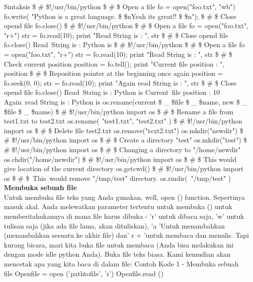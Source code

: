 Sintaksis 
 \$  \#  \$!/usr/bin/python 
 \$  \#  \$ Open a file  
fo = open("foo.txt", "wb") 
fo.write( "Python is a great language. \$  \setminus  \$nYeah its great!! \$  \setminus  \$n");  
 \$  \#  \$ Close opend file  
fo.close()  
 \$  \#  \$!/usr/bin/python  
 \$  \#  \$ Open a file 
fo = open("foo.txt", "r+") 
str = fo.read(10); 
print "Read String is : ", str 
 \$  \#  \$ Close opend file 
fo.close()  
Read~String is :  Python is 
 \$  \#  \$!/usr/bin/python 
 \$  \#  \$ Open a file  
fo = open("foo.txt", "r+") 
str = fo.read(10);
print "Read String is : ", str 
 \$  \#  \$ Check current position 
position = fo.tell(); 
print "Current file position : ", position 
 \$  \#  \$ Reposition pointer at the beginning once again  
position = fo.seek(0, 0);  
str = fo.read(10); 
print "Again read String is : ", str 
 \$  \#  \$ Close opend file 
fo.close() 
Read~String is :  Python is 
Current~file position :  10 
Again~read String is :  Python is 
os.rename(current \$  \_  \$file \$  \_  \$name, new \$  \_  \$file \$  \_  \$name) 
 \$  \#  \$!/usr/bin/python 
import os 
 \$  \#  \$ Rename a file from test1.txt to test2.txt 
os.rename( "test1.txt", "test2.txt" ) 
 \$  \#  \$!/usr/bin/python 
import os 
 \$  \#  \$ Delete file test2.txt  
os.remove("text2.txt") 
os.mkdir("newdir") 
 \$  \#  \$!/usr/bin/python 
import os 
 \$  \#  \$ Create a directory "test" 
os.mkdir("test") 
 \$  \#  \$!/usr/bin/python 
import os  
 \$  \#  \$ Changing a directory to "/home/newdir" 
os.chdir("/home/newdir")  
 \$  \#  \$!/usr/bin/python 
import os 
 \$  \#  \$ This would give location of the current directory 
os.getcwd() 
 \$  \#  \$!/usr/bin/python 
import os  
 \$  \#  \$~This~would  remove "/tmp/test"  directory.
os.rmdir(~"/tmp/test"  )  
{\fontsize{14pt}{14pt}\selectfont \textbf{Membuka sebuah file} \\}
Untuk membuka file teks yang Anda gunakan, well, open () function. Sepertinya masuk akal. Anda melewatkan parameter tertentu untuk membuka () untuk memberitahukannya di mana file harus dibuka - 'r' untuk dibaca saja, 'w' untuk tulisan saja (jika ada file lama, akan dituliskan), 'a 'Untuk menambahkan (menambahkan sesuatu ke akhir file) dan' r + 'untuk membaca dan menulis. Tapi kurang bicara, mari kita buka file untuk membaca (Anda bisa melakukan ini dengan mode idle python Anda). Buka file teks biasa. Kami kemudian akan mencetak apa yang kita baca di dalam file: 
Contoh Kode 1 - Membuka sebuah file  
Openfile = open ('pathtofile', 'r') 
Openfile.read ()
